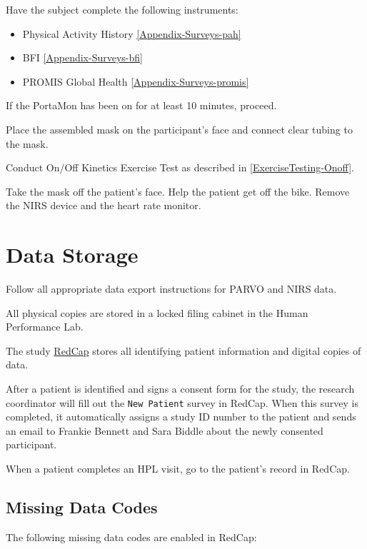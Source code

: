 \documentclass[
]{book}
\providecommand{\tightlist}{%
  \setlength{\itemsep}{0pt}\setlength{\parskip}{0pt}}
\begin{document}
Have the subject complete the following instruments:

\begin{itemize}
\tightlist
\item
  Physical Activity History \ref{Appendix-Surveys-pah}
\item
  BFI \ref{Appendix-Surveys-bfi}
\item
  PROMIS Global Health \ref{Appendix-Surveys-promis}
\end{itemize}

If the PortaMon has been on for at least 10 minutes, proceed.

Place the assembled mask on the participant's face and connect clear tubing to the mask.

Conduct On/Off Kinetics Exercise Test as described in \ref{ExerciseTesting-Onoff}.

Take the mask off the patient's face. Help the patient get off the bike. Remove the NIRS device and the heart rate monitor.

\hypertarget{DataStorage}{%
\chapter{Data Storage}\label{DataStorage}}

Follow all appropriate data export instructions for PARVO and NIRS data.

All physical copies are stored in a locked filing cabinet in the Human Performance Lab.

The study \href{https://redcap.prismahealth.org}{RedCap} stores all identifying patient information and digital copies of data.

After a patient is identified and signs a consent form for the study, the research coordinator will fill out the \texttt{New\ Patient} survey in RedCap. When this survey is completed, it automatically assigns a study ID number to the patient and sends an email to Frankie Bennett and Sara Biddle about the newly consented participant.

When a patient completes an HPL visit, go to the patient's record in RedCap.

\hypertarget{DataStorage-MissingData}{%
\section{Missing Data Codes}\label{DataStorage-MissingData}}

The following missing data codes are enabled in RedCap:
\end{document}
